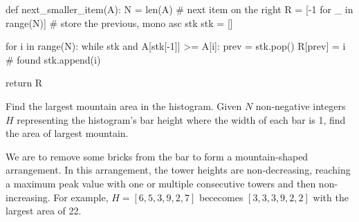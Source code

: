 \begin{python}
def next_smaller_item(A):
    N = len(A)
    # next item on the right
    R = [-1 for _ in range(N)]
    # store the previous, mono asc stk
    stk = [] 
    
    for i in range(N):
        while stk and A[stk[-1]] >= A[i]:
            prev = stk.pop()
            R[prev] = i  # found
        stk.append(i)
    
    return R
\end{python}

 Find the largest mountain area in the histogram. Given $N$ non-negative integers $H$ representing the histogram's bar height where the width of each bar is 1, find the area of largest mountain. 

We are to remove some bricks from the bar to form a mountain-shaped arrangement. In this arrangement, the tower heights are non-decreasing, reaching a maximum peak value with one or multiple consecutive towers and then non-increasing. For example, $H = [6,5,3,9,2,7]$ bececomes $[3,3,3,9,2,2]$ with the largest area of 22.

